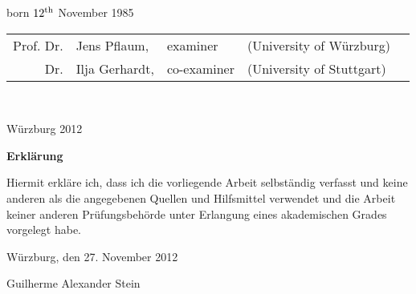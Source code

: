 \begin{titlepage}
born $12^{\rm{th}}$ November 1985\\ \vspace{0.5cm}


\vspace{0.5cm}

\begin{tabular}{rl l l l}
Prof. Dr.& Jens Pflaum,&examiner &(University of Würzburg)\\
Dr.&Ilja Gerhardt,&co-examiner &(University of Stuttgart)
\end{tabular}\\ \vspace{1cm}

Würzburg 2012

%

\end{titlepage}


\newpage\null

\vspace{4cm}

\begin{center}
	\Large\textbf{{Erklärung}}
\end{center}

\vspace{1.5cm}
 
Hiermit erkläre ich, dass ich die vorliegende Arbeit selbständig verfasst und keine 
anderen als die angegebenen Quellen und Hilfsmittel verwendet und die Arbeit 
keiner anderen Prüfungsbehörde unter Erlangung eines akademischen Grades 
vorgelegt habe. 
 
 \vspace{1cm}
           
\begin{flushleft}
	Würzburg, den 27. November 2012      
\end{flushleft}
	\vspace{1cm}
\begin{flushright}
	Guilherme Alexander Stein
\end{flushright}

